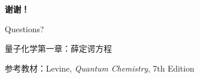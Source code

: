 \documentclass[aspectratio=169,11pt]{beamer}
\begin{document}
\begin{frame}[plain]
  \begin{center}
    \vspace*{2cm}
    {\Huge\color{iqbblue}\textbf{谢谢！}}

    \vspace{1cm}

    {\Large Questions?}

    \vspace{2cm}

    {\large 量子化学第一章：薛定谔方程}

    \vspace{0.5cm}

    {\normalsize 参考教材：Levine, \textit{Quantum Chemistry}, 7th Edition}
  \end{center}
\end{frame}
\end{document}
